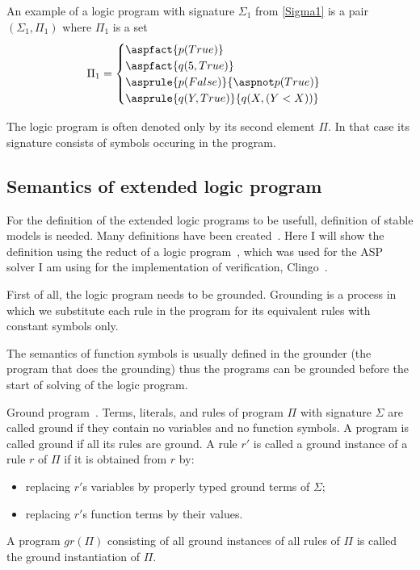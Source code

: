 \begin{example}\label{exp:logic_program1}
    An example of a logic program with signature $\Sigma_1$ from \cref{Sigma1}
    is a pair $(\Sigma_1, \Pi_1)$ where $\Pi_1$ is a set
    \begin{equation*}
        \Pi_1 =
            \begin{cases}
                \aspfact{p(True)}\\
                \aspfact{q(5, True)}\\
                \asprule{p(False)}{\aspnot p(True)}\\
                \asprule{q(Y, True)}{q(X, (Y < X))}
            \end{cases}
    \end{equation*}
\end{example}

The logic program is often denoted only by its second element $\Pi$.
In that case its signature consists of symbols occuring in the program.


\subsection{Semantics of extended logic program}

For the definition of the extended logic programs to be usefull,
definition of stable models is needed.
Many definitions have been created~\cite{12definitions}.
Here I will show the definition using the reduct
of a logic program~\cite{KRHandbook},
which was used for the ASP solver I am using for the implementation
of verification, Clingo~\cite{GebserKKS17}.

First of all, the logic program needs to be grounded.
Grounding is a process in which we substitute each rule
in the program for its equivalent rules with constant symbols only.

The semantics of function symbols is usually defined in the groun\-d\-er
(the program that does the grounding)
thus the programs can be grounded before the start of solving
of the logic program.

\begin{definition}{Ground program~\cite{KRHandbook}.}
    Terms, literals, and rules of program $\Pi$ with signature $\Sigma$ are called ground if they
    contain no variables and no function symbols. A program is called
    ground if all its rules are ground. A rule $r'$ is called a ground instance of a rule $r$ of $\Pi$
    if it is obtained from $r$ by:
    \begin{itemize}
        \item replacing $r'$s variables by properly typed ground terms of $\Sigma$;
        \item replacing $r'$s function terms by their values.
    \end{itemize}
    A program $gr(\Pi)$ consisting of all ground instances of all rules of $\Pi$
    is called the ground instantiation of $\Pi$.
\end{definition}

